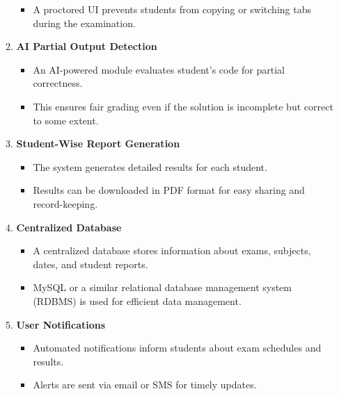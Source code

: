 \documentclass[14pt]{article}
\begin{document}
\begin{enumerate}
\begin{enumerate}
\begin{itemize}
\item A proctored UI prevents students from copying or switching tabs during the examination.
\end{itemize}
\item \textbf{AI Partial Output Detection}
\begin{itemize}
\item An AI-powered module evaluates student's code for partial correctness.
\item This ensures fair grading even if the solution is incomplete but correct to some extent.
\end{itemize}
\item \textbf{Student-Wise Report Generation}
\begin{itemize}
\item The system generates detailed results for each student.
\item Results can be downloaded in PDF format for easy sharing and record-keeping.
\end{itemize}
\item \textbf{Centralized Database}
\begin{itemize}
\item A centralized database stores information about exams, subjects, dates, and student reports.
\item MySQL or a similar relational database management system (RDBMS) is used for efficient data management.
\end{itemize}
\item \textbf{User Notifications}
\begin{itemize}
\item Automated notifications inform students about exam schedules and results.
\item Alerts are sent via email or SMS for timely updates.
\end{itemize}
\end{enumerate}



\end{enumerate}
\end{document}
